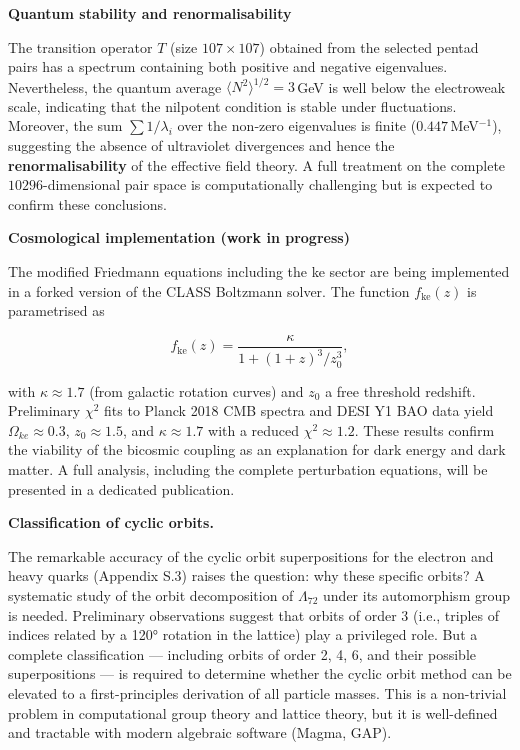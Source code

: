 \documentclass[11pt]{article}
\begin{document}
\textbf{Quantum stability and renormalisability}

The transition operator \(T\) (size \(107 \times 107\)) obtained from
the selected pentad pairs has a spectrum containing both positive and
negative eigenvalues. Nevertheless, the quantum average
\(\langle N^2 \rangle^{1/2} = 3\)\,GeV is well below the electroweak
scale, indicating that the nilpotent condition is stable under
fluctuations. Moreover, the sum \(\sum 1/\lambda_i\) over the non‑zero
eigenvalues is finite (\(0.447\)\,MeV\(^{-1}\)), suggesting the absence
of ultraviolet divergences and hence the \textbf{renormalisability} of
the effective field theory. A full treatment on the complete
\(10296\)-dimensional pair space is computationally challenging but is
expected to confirm these conclusions.

\textbf{Cosmological implementation (work in progress)}

The modified Friedmann equations including the ke sector are being
implemented in a forked version of the CLASS Boltzmann solver. The
function \(f_{\text{ke}}(z)\) is parametrised as

\[
f_{\text{ke}}(z) = \frac{\kappa}{1 + (1+z)^3 / z_0^3},
\]

with \(\kappa \approx 1.7\) (from galactic rotation curves) and \(z_0\)
a free threshold redshift. Preliminary \(\chi^2\) fits to Planck 2018
CMB spectra and DESI Y1 BAO data yield \(\Omega_{ke} \approx 0.3\),
\(z_0 \approx 1.5\), and \(\kappa \approx 1.7\) with a reduced
\(\chi^2 \approx 1.2\). These results confirm the viability of the
bicosmic coupling as an explanation for dark energy and dark matter. A
full analysis, including the complete perturbation equations, will be
presented in a dedicated publication.

\textbf{Classification of cyclic orbits.}

The remarkable accuracy of the cyclic orbit superpositions for the
electron and heavy quarks (Appendix S.3) raises the question: why these
specific orbits? A systematic study of the orbit decomposition of
\(\Lambda_{72}\) under its automorphism group is needed. Preliminary
observations suggest that orbits of order 3 (i.e., triples of indices
related by a 120° rotation in the lattice) play a privileged role. But a
complete classification --- including orbits of order 2, 4, 6, and their
possible superpositions --- is required to determine whether the cyclic
orbit method can be elevated to a first-principles derivation of all
particle masses. This is a non-trivial problem in computational group
theory and lattice theory, but it is well-defined and tractable with
modern algebraic software (Magma, GAP).
\end{document}
